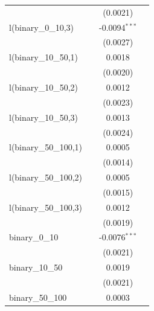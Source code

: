 \begin{tabular}{lccc}
                                               &          & (0.0021)               &   \\   
   l(binary\_0\_10,3)                          &          & -0.0094$^{***}$        &   \\   
                                               &          & (0.0027)               &   \\   
   l(binary\_10\_50,1)                         &          & 0.0018                 &   \\   
                                               &          & (0.0020)               &   \\   
   l(binary\_10\_50,2)                         &          & 0.0012                 &   \\   
                                               &          & (0.0023)               &   \\   
   l(binary\_10\_50,3)                         &          & 0.0013                 &   \\   
                                               &          & (0.0024)               &   \\   
   l(binary\_50\_100,1)                        &          & 0.0005                 &   \\   
                                               &          & (0.0014)               &   \\   
   l(binary\_50\_100,2)                        &          & 0.0005                 &   \\   
                                               &          & (0.0015)               &   \\   
   l(binary\_50\_100,3)                        &          & 0.0012                 &   \\   
                                               &          & (0.0019)               &   \\   
   binary\_0\_10                               &          & -0.0076$^{***}$        &   \\   
                                               &          & (0.0021)               &   \\   
   binary\_10\_50                              &          & 0.0019                 &   \\   
                                               &          & (0.0021)               &   \\   
   binary\_50\_100                             &          & 0.0003                 &   \\   

\end{tabular}
